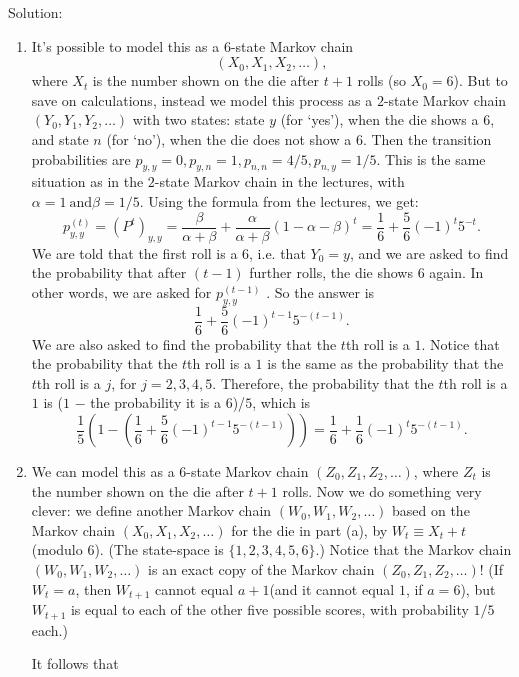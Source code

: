 \documentclass[11pt,a4paper]{report}
\begin{document}
\begin{enumerate}
\begin{enumerate}
        \end{enumerate}
        Solution:
        \begin{enumerate}
            \item It’s possible to model this as a $6$-state Markov chain $$(X_0, X_1, X_2, \ldots),$$
            where $X_t$ is the number shown on the die after $t+1$ rolls (so $X_0 = 6$). But to save on calculations, instead we model this process as a $2$-state Markov chain $(Y_0, Y_1, Y_2,\ldots)$ with two states: state $y$ (for ‘yes’), when the die shows a $6$, and state $n$ (for ‘no’), when the die does not show a $6$. Then the transition probabilities are $p_{y,y} = 0, p_{y,n} = 1, p_{n,n} = 4/5, p_{n,y} = 1/5$. This is the same situation as in the $2$-state Markov chain in the lectures, with $\alpha = 1\ \text{and} \beta = 1/5$. Using the formula from the lectures, we get:
            $$p^{(t)}_{y,y}=(P^t)_{y,y}=\frac{\beta}{\alpha+\beta}+\frac{\alpha}{\alpha+\beta}(1-\alpha-\beta)^t=\frac{1}{6}+\frac{5}{6}(-1)^t5^{-t}.$$
            We are told that the first roll is a $6$, i.e. that $Y_0 = y$, and we are asked to find the probability that after $(t − 1)$ further rolls, the die shows $6$ again. In other words, we are asked for $p^{(t−1)}_{y,y}$ . So the answer is $$\frac{1}{6}+\frac{5}{6}(-1)^{t-1}5^{-(t-1)}.$$
            We are also asked to find the probability that the $t$th roll is a $1$. Notice that the probability that the $t$th roll is a $1$ is the same as the probability that the $t$th roll is a $j$, for $j = 2, 3, 4, 5$. Therefore, the probability that the $t$th roll is a $1$ is ($1$ − the probability it is a $6$)/$5$, which is $$\frac{1}{5}\left(1-\left(\frac{1}{6}+\frac{5}{6}(-1)^{t-1}5^{-(t-1)}\right)\right)=\frac{1}{6}+\frac{1}{6}(-1)^t5^{-(t-1)}.$$
            \item We can model this as a $6$-state Markov chain $(Z_0, Z_1, Z_2,\ldots)$, where $Z_t$ is the number shown on the die after $t + 1$ rolls. Now we do something very clever: we define another Markov chain $(W_0, W_1, W_2,\ldots)$ based on the Markov chain $(X_0, X_1, X_2,\ldots)$ for the die in part (a), by $W_t \equiv X_t + t$ (modulo $6$). (The state-space is $\{1, 2, 3, 4, 5, 6\}$.) Notice that the Markov chain $(W_0, W_1, W_2, \ldots)$ is an exact copy of the Markov chain $(Z_0, Z_1, Z_2,\ldots)$! (If $W_t = a$, then $W_{t+1}$ cannot equal $a + 1$(and it cannot equal $1$, if $a = 6$), but $W_{t+1}$ is equal to each of the other five possible scores, with probability $1/5$ each.)\par
            It follows that

\end{enumerate}
\end{enumerate}
\end{document}
